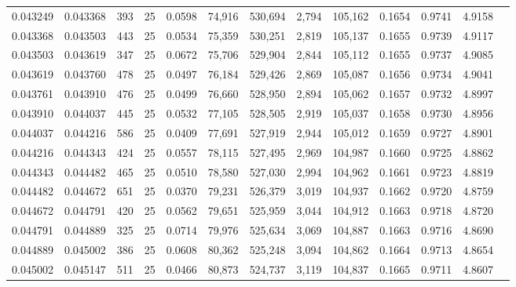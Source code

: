\begin{tabular}{rrrrrrrrrrrrr}
0.043249 & 0.043368 &   393 &  25 &                                     0.0598 &  74,916 & 530,694 &   2,794 & 105,162 & 0.1654 & 0.9741 & 4.9158 \\
0.043368 & 0.043503 &   443 &  25 &                                     0.0534 &  75,359 & 530,251 &   2,819 & 105,137 & 0.1655 & 0.9739 & 4.9117 \\
0.043503 & 0.043619 &   347 &  25 &                                     0.0672 &  75,706 & 529,904 &   2,844 & 105,112 & 0.1655 & 0.9737 & 4.9085 \\
0.043619 & 0.043760 &   478 &  25 &                                     0.0497 &  76,184 & 529,426 &   2,869 & 105,087 & 0.1656 & 0.9734 & 4.9041 \\
0.043761 & 0.043910 &   476 &  25 &                                     0.0499 &  76,660 & 528,950 &   2,894 & 105,062 & 0.1657 & 0.9732 & 4.8997 \\
0.043910 & 0.044037 &   445 &  25 &                                     0.0532 &  77,105 & 528,505 &   2,919 & 105,037 & 0.1658 & 0.9730 & 4.8956 \\
0.044037 & 0.044216 &   586 &  25 &                                     0.0409 &  77,691 & 527,919 &   2,944 & 105,012 & 0.1659 & 0.9727 & 4.8901 \\
0.044216 & 0.044343 &   424 &  25 &                                     0.0557 &  78,115 & 527,495 &   2,969 & 104,987 & 0.1660 & 0.9725 & 4.8862 \\
0.044343 & 0.044482 &   465 &  25 &                                     0.0510 &  78,580 & 527,030 &   2,994 & 104,962 & 0.1661 & 0.9723 & 4.8819 \\
0.044482 & 0.044672 &   651 &  25 &                                     0.0370 &  79,231 & 526,379 &   3,019 & 104,937 & 0.1662 & 0.9720 & 4.8759 \\
0.044672 & 0.044791 &   420 &  25 &                                     0.0562 &  79,651 & 525,959 &   3,044 & 104,912 & 0.1663 & 0.9718 & 4.8720 \\
0.044791 & 0.044889 &   325 &  25 &                                     0.0714 &  79,976 & 525,634 &   3,069 & 104,887 & 0.1663 & 0.9716 & 4.8690 \\
0.044889 & 0.045002 &   386 &  25 &                                     0.0608 &  80,362 & 525,248 &   3,094 & 104,862 & 0.1664 & 0.9713 & 4.8654 \\
0.045002 & 0.045147 &   511 &  25 &                                     0.0466 &  80,873 & 524,737 &   3,119 & 104,837 & 0.1665 & 0.9711 & 4.8607 \\

\end{tabular}
